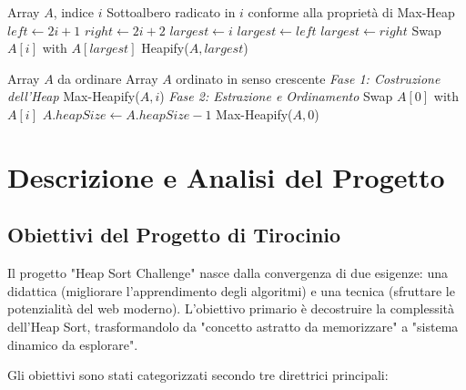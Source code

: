 \documentclass[openany]{theme/uniprthesis}
\begin{document}
\begin{algorithm}
\caption{Max-Heapify (Versione Ricorsiva)}
\begin{algorithmic}[1]
\Require Array $A$, indice $i$
\Ensure Sottoalbero radicato in $i$ conforme alla proprietà di Max-Heap
\State $left \gets 2i + 1$
\State $right \gets 2i + 2$
\State $largest \gets i$
    \State $largest \gets left$
\EndIf
{}
    \State $largest \gets right$
\EndIf
{}
    \State Swap $A[i]$ with $A[largest]$
    \State Heapify($A, largest$)
\EndIf
\end{algorithmic}
\end{algorithm}

\begin{algorithm}
\caption{Heap Sort Completo}
\begin{algorithmic}[1]
\Require Array $A$ da ordinare
\Ensure Array $A$ ordinato in senso crescente
\State \emph{Fase 1: Costruzione dell'Heap}
    \State Max-Heapify($A, i$)
\EndFor
\State \emph{Fase 2: Estrazione e Ordinamento}
    \State Swap $A[0]$ with $A[i]$
    \State $A.heapSize \gets A.heapSize - 1$
    \State Max-Heapify($A, 0$)
\EndFor
\end{algorithmic}
\end{algorithm}


\newpage

\chapter{Descrizione e Analisi del Progetto}

\section{Obiettivi del Progetto di Tirocinio}
Il progetto "Heap Sort Challenge" nasce dalla convergenza di due esigenze: una didattica (migliorare l'apprendimento degli algoritmi) e una tecnica (sfruttare le potenzialità del web moderno).
L'obiettivo primario è decostruire la complessità dell'Heap Sort, trasformandolo da "concetto astratto da memorizzare" a "sistema dinamico da esplorare".

Gli obiettivi sono stati categorizzati secondo tre direttrici principali:
\end{document}

